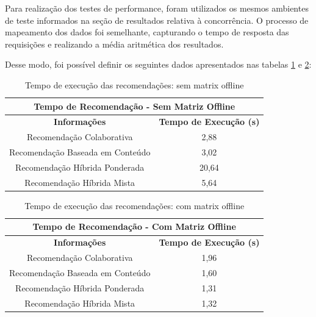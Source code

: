 Para realização dos testes de performance, foram utilizados os mesmos ambientes de teste informados na seção de resultados relativa à concorrência. O processo de mapeamento dos dados foi semelhante, capturando o tempo de resposta das requisições e realizando a média aritmética dos resultados.

Desse modo, foi possível definir os seguintes dados apresentados nas tabelas \ref{tableref:execucaoRecomendacaoSemMatrix} e \ref{tableref:execucaoRecomendacaoComMatrix}:

\begin{table}[H]
\centering
\begin{tabular}{|c|c|}
\hline
\multicolumn{2}{|c|}{\textbf{Tempo de Recomendação - Sem Matriz Offline}} \\ \hline
\textbf{Informações}                 & \textbf{Tempo de Execução (s)}    \\ \hline
Recomendação Colaborativa            & 2,88                               \\ \hline
Recomendação Baseada em Conteúdo     & 3,02                               \\ \hline
Recomendação Híbrida Ponderada       & 20,64                              \\ \hline
Recomendação Híbrida Mista           & 5,64                               \\ \hline
\end{tabular}
\caption{Tempo de execução das recomendações: sem matrix offline}
\label{tableref:execucaoRecomendacaoSemMatrix}
\end{table}

\begin{table}[H]
\centering
\begin{tabular}{|c|c|}
\hline
\multicolumn{2}{|c|}{\textbf{Tempo de Recomendação - Com Matriz Offline}} \\ \hline
\textbf{Informações}                 & \textbf{Tempo de Execução (s)}    \\ \hline
Recomendação Colaborativa            & 1,96                               \\ \hline
Recomendação Baseada em Conteúdo     & 1,60                             \\ \hline
Recomendação Híbrida Ponderada       & 1,31                               \\ \hline
Recomendação Híbrida Mista           & 1,32                               \\ \hline
\end{tabular}
\caption{Tempo de execução das recomendações: com matrix offline}
\label{tableref:execucaoRecomendacaoComMatrix}
\end{table}
